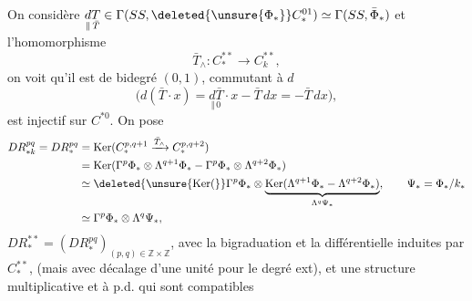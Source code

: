 On considère $\underset{\Vert\,\bar T}{dT}\in
\Gamma(SS,\deleted{\unsure{\Phi_*}}C_*^{01})\simeq\Gamma(SS,\bar\Phi_*)$
et l'homomorphisme
\[
\bar T_{\wedge}:C_*^{**}\longrightarrow C_k^{**},
\]
on voit qu'il est de bidegré $(0,1)$, 
commutant à $d$
\[
\bigl(d(\bar T\cdot x)=\underset{\Vert\,0}{d\bar T}\cdot x-\bar T\,dx=-\bar T\,dx\bigr),
\]
est injectif sur $C^{*0}$. On pose
\[
\begin{aligned}
DR_{*k}^{pq}=DR_*^{pq}
&=\operatorname{Ker}(C_*^{p,q+1}\xrightarrow{\bar T_\wedge}C_*^{p,q+2})\\
&=\operatorname{Ker}(\Gamma^p\Phi_*\otimes\Lambda^{q+1}\Phi_*-\Gamma^p\Phi_*\otimes\Lambda^{q+2}\Phi_*)\\
&\simeq\deleted{\unsure{\operatorname{Ker}(}}\Gamma^p\Phi_*\otimes
\underbrace{\operatorname{Ker}(\Lambda^{q+1}\Phi_*-\Lambda^{q+2}\Phi_*)}_{\Lambda^q\Psi_*},
\qquad\Psi_*=\Phi_*/k_*\\
&\simeq\Gamma^p\Phi_*\otimes\Lambda^q\Psi_*,
\end{aligned}
\]
$DR_*^{**}=(DR_*^{pq})_{(p,q)\in\mathbb Z\times\mathbb Z}$, avec la bigraduation et la différentielle  induites par $C_*^{**}$,
 (mais avec décalage d'une unité pour le degré ext), et une structure multiplicative  et à p.d. qui sont compatibles
